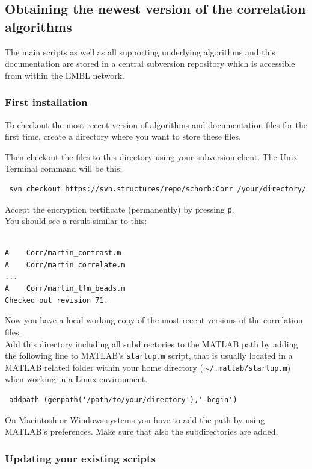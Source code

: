 \documentclass[10pt,a4paper,onepage,DIV12]{scrartcl}
\begin{document}
\subsection{Obtaining the newest version of the correlation algorithms}
The main scripts as well as all supporting underlying algorithms and this documentation are stored in a central subversion repository which is accessible from within the EMBL network.
\subsubsection*{First installation}
To checkout the most recent version of algorithms and documentation files for the first time, create a directory where you want to store these files. 

Then checkout the files to this directory using your subversion client. The Unix Terminal command will be this:
\begin{verbatim}
 svn checkout https://svn.structures/repo/schorb:Corr /your/directory/
\end{verbatim}
Accept the encryption certificate (permanently) by pressing \texttt{p}.\\

You should see a result similar to this:
\begin{verbatim}

A    Corr/martin_contrast.m 
A    Corr/martin_correlate.m
...
A    Corr/martin_tfm_beads.m
Checked out revision 71.

\end{verbatim}

Now you have a local working copy of the most recent versions of the correlation files.\\

Add this directory including all subdirectories to the MATLAB path by adding the following line to MATLAB's \texttt{startup.m} script, that is usually located in a MATLAB related folder within your home directory (\texttt{$\sim$/.matlab/startup.m}) when working in a Linux environment. 
\begin{verbatim}
 addpath (genpath('/path/to/your/directory'),'-begin')
\end{verbatim}
On Macintosh or Windows systems you have to add the path by using MATLAB's preferences. Make sure that also the subdirectories are added.\\
\subsubsection*{Updating your existing scripts}
\end{document}
